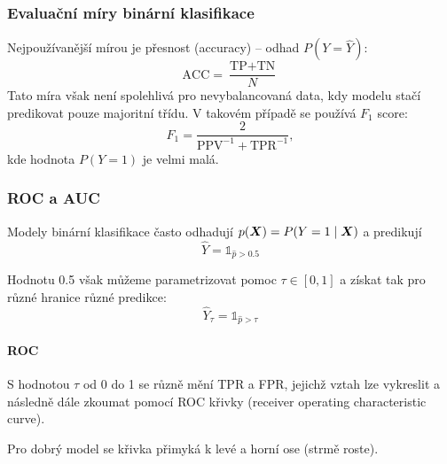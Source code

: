 \subsubsection{Evaluační míry binární klasifikace}

Nejpoužívanější mírou je přesnost (accuracy) -- odhad $P(Y = \hat{Y})$:
\[\text{ACC} = \frac{\text{TP} + \text{TN}}{N}\]
Tato míra však není spolehlivá pro nevybalancovaná data, kdy modelu stačí predikovat pouze majoritní třídu. V takovém případě se používá $F_1$ score:
\[F_1 = \frac{2}{\text{PPV}^{-1} + \text{TPR}^{-1}},\]
kde hodnota $P(Y=1)$ je velmi malá.

\subsubsection{ROC a AUC}

Modely binární klasifikace často odhadují $p(\bm{X}) = P(Y = 1 \mid \bm{X})$ a predikují
\[\hat{Y} = \mathds{1}_{\hat{p} > 0.5}\]

Hodnotu 0.5 však můžeme parametrizovat pomoc $\tau \in [0, 1]$ a získat tak pro různé hranice různé predikce:
\[\hat{Y}_\tau = \mathds{1}_{\hat{p} > \tau}\]

\paragraph{ROC}

S hodnotou $\tau$ od 0 do 1 se různě mění TPR a FPR, jejichž vztah lze vykreslit a následně dále zkoumat pomocí ROC křivky (receiver operating characteristic curve).
\begin{center}
    \small
\end{center}
Pro dobrý model se křivka přimyká k levé a horní ose (strmě roste).

